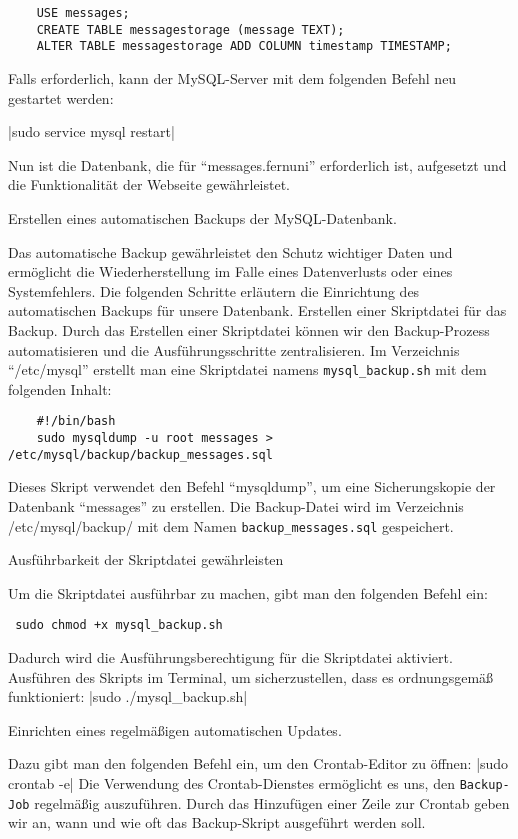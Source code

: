 \begin{verbatim}
    USE messages;
    CREATE TABLE messagestorage (message TEXT);
    ALTER TABLE messagestorage ADD COLUMN timestamp TIMESTAMP;
\end{verbatim}

Falls erforderlich, kann der MySQL-Server mit dem folgenden Befehl neu gestartet werden:

|sudo service mysql restart|

Nun ist die Datenbank, die für \enquote{messages.fernuni} erforderlich ist, aufgesetzt und die Funktionalität der Webseite gewährleistet.

Erstellen eines automatischen Backups der MySQL-Datenbank.

Das automatische Backup gewährleistet den Schutz wichtiger Daten und ermöglicht die Wiederherstellung im Falle eines Datenverlusts oder eines Systemfehlers. Die folgenden Schritte erläutern die Einrichtung des automatischen Backups für unsere Datenbank.
Erstellen einer Skriptdatei für das Backup.
Durch das Erstellen einer Skriptdatei können wir den Backup-Prozess automatisieren und die Ausführungsschritte zentralisieren.
Im Verzeichnis \enquote{/etc/mysql} erstellt man eine Skriptdatei namens \verb+mysql_backup.sh+ mit dem folgenden Inhalt:

\begin{verbatim}
    #!/bin/bash
    sudo mysqldump -u root messages > /etc/mysql/backup/backup_messages.sql
\end{verbatim}

Dieses Skript verwendet den Befehl \enquote{mysqldump}, um eine Sicherungskopie der Datenbank \enquote{messages} zu erstellen. 
Die Backup-Datei wird im Verzeichnis /etc/mysql/backup/ mit dem Namen \verb+backup_messages.sql+ gespeichert.

Ausführbarkeit der Skriptdatei gewährleisten

Um die Skriptdatei ausführbar zu machen, gibt man den folgenden Befehl ein:
\begin{verbatim} sudo chmod +x mysql_backup.sh \end{verbatim}
Dadurch wird die Ausführungsberechtigung für die Skriptdatei aktiviert.
Ausführen des Skripts im Terminal, um sicherzustellen, dass es ordnungsgemäß funktioniert:
|sudo ./mysql_backup.sh|

Einrichten eines regelmäßigen automatischen Updates.

Dazu gibt man den folgenden Befehl ein, um den Crontab-Editor zu öffnen:
|sudo crontab -e|
Die Verwendung des Crontab-Dienstes ermöglicht es uns, den \verb+Backup-Job+ regelmäßig auszuführen. Durch das Hinzufügen einer Zeile zur Crontab geben wir an, wann und wie oft das Backup-Skript ausgeführt werden soll. 

